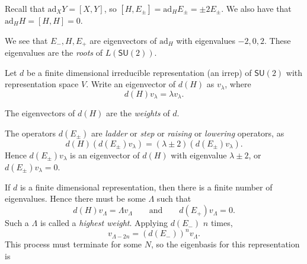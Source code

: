 \documentclass[12pt]{article}
\begin{document}
Recall that $\mathrm{ad}_X Y = [X, Y]$, so $[H, E_{\pm}] = \mathrm{ad}_H E_{\pm} = \pm 2 E_{\pm}$. We also have that $\mathrm{ad}_H H = [H, H] = 0$.

We see that $E_-, H, E_+$ are eigenvectors of $\mathrm{ad}_H$ with eigenvalues $-2, 0, 2$. These eigenvalues are the \emph{roots} of $L(\mathsf{SU}(2))$.

Let $d$ be a finite dimensional irreducible representation (an irrep) of $\mathsf{SU}(2)$ with representation space $V$. Write an eigenvector of $d(H)$ as $v_\lambda$, where
\[
d(H) v_\lambda = \lambda v_\lambda.
\]

\begin{definition}
	The eigenvectors of $d(H)$ are the \emph{weights} of $d$.
\end{definition}

The operators $d(E_{\pm})$ are \emph{ladder} or \emph{step} or \emph{raising} or \emph{lowering} operators, as
\[
d(H) (d(E_{\pm})v_\lambda) = (\lambda \pm 2)(d(E_{\pm}) v_\lambda).
\]
Hence $d(E_{\pm})v_\lambda$ is an eigenvector of $d(H)$ with eigenvalue $\lambda \pm 2$, or $d(E_{\pm}) v_\lambda = 0$.



If $d$ is a finite dimensional representation, then there is a finite number of eigenvalues. Hence there must be some $\Lambda$ such that
\[
	d(H) v_\Lambda = \Lambda v_\Lambda \qquad \text{and} \qquad d(E_+) v_\Lambda = 0.
\]
Such a $\Lambda$ is called a \emph{highest weight}. Applying $d(E_-)$ $n$ times,
\[
v_{\Lambda - 2n} = (d(E_-))^{n} v_\Lambda.
\]
This process must terminate for some $N$, so the eigenbasis for this representation is


\newpage

\printindex
\end{document}

